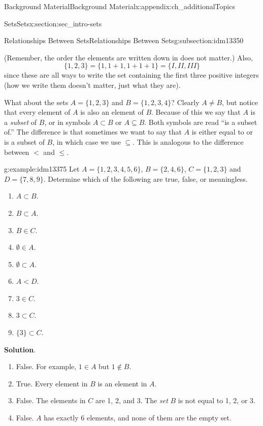 \documentclass[oneside,10pt,]{book}
\numberwithin{equation}{chapter}
\newcommand{\lt}{<}
\begin{document}
\begin{appendixptx}{Background Material}{}{Background Material}{}{}{x:appendix:ch_additionalTopics}
\begin{sectionptx}{Sets}{}{Sets}{}{}{x:section:sec_intro-sets}
\begin{subsectionptx}{Relationships Between Sets}{}{Relationships Between Sets}{}{}{g:subsection:idm13350}
%
\par
(Remember, the order the elements are written down in does not matter.) Also,%
\begin{equation*}
\{1, 2, 3\} = \{1, 1+1, 1+1+1\} = \{I, II, III\}
\end{equation*}
since these are all ways to write the set containing the first three positive integers (how we write them doesn't matter, just what they are).%
\par
What about the sets \(A = \{1, 2, 3\}\) and \(B = \{1, 2, 3, 4\}\)? Clearly \(A \ne B\), but notice that every element of \(A\) is also an element of \(B\). Because of this we say that \(A\) is a \emph{subset}  of \(B\), or in symbols \(A \subset B\) or \(A \subseteq B\). Both symbols are read ``is a subset of.'' The difference is that sometimes we want to say that \(A\) is either equal to or is a subset of \(B\), in which case we use \(\subseteq\). This is analogous to the difference between \(\lt\) and \(\le\).%
\begin{example}{}{g:example:idm13375}%
Let \(A = \{1, 2, 3, 4, 5, 6\}\), \(B = \{2, 4, 6\}\), \(C = \{1, 2, 3\}\) and \(D = \{7, 8, 9\}\). Determine which of the following are true, false, or meaningless.%
\par
%
\begin{enumerate}
\item{}\(A \subset B\).%
\item{}\(B \subset A\).%
\item{}\(B \in C\).%
\item{}\(\emptyset \in A\).%
\item{}\(\emptyset \subset A\).%
\item{}\(A \lt  D\).%
\item{}\(3 \in C\).%
\item{}\(3 \subset C\).%
\item{}\(\{3\} \subset C\).%
\end{enumerate}
%
\par\smallskip%
\noindent\textbf{Solution}.\hypertarget{g:solution:idm13402}{}\quad{}%
\begin{enumerate}
\item{}False. For example, \(1\in A\) but \(1 \notin B\).%
\item{}True. Every element in \(B\) is an element in \(A\).%
\item{}False. The elements in \(C\) are 1, 2, and 3. The \emph{set} \(B\) is not equal to 1, 2, or 3.%
\item{}False. \(A\) has exactly 6 elements, and none of them are the empty set.%

\end{enumerate}
\end{example}
\end{subsectionptx}
\end{sectionptx}
\end{appendixptx}
\end{document}
